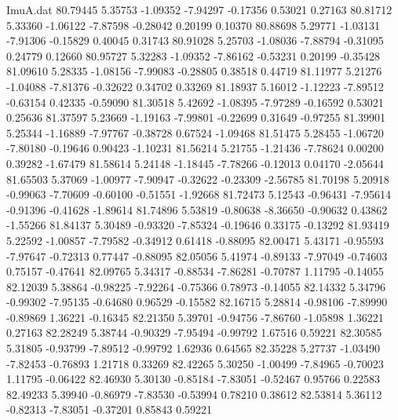 \begin{filecontents}{ImuA.dat}
  80.79445    5.35753   -1.09352   -7.94297   -0.17356    0.53021    0.27163
  80.81712    5.33360   -1.06122   -7.87598   -0.28042    0.20199    0.10370
  80.88698    5.29771   -1.03131   -7.91306   -0.15829    0.40045    0.31743
  80.91028    5.25703   -1.08036   -7.88794   -0.31095    0.24779    0.12660
  80.95727    5.32283   -1.09352   -7.86162   -0.53231    0.20199   -0.35428
  81.09610    5.28335   -1.08156   -7.99083   -0.28805    0.38518    0.44719
  81.11977    5.21276   -1.04088   -7.81376   -0.32622    0.34702    0.33269
  81.18937    5.16012   -1.12223   -7.89512   -0.63154    0.42335   -0.59090
  81.30518    5.42692   -1.08395   -7.97289   -0.16592    0.53021    0.25636
  81.37597    5.23669   -1.19163   -7.99801   -0.22699    0.31649   -0.97255
  81.39901    5.25344   -1.16889   -7.97767   -0.38728    0.67524   -1.09468
  81.51475    5.28455   -1.06720   -7.80180   -0.19646    0.90423   -1.10231
  81.56214    5.21755   -1.21436   -7.78624    0.00200    0.39282   -1.67479
  81.58614    5.24148   -1.18445   -7.78266   -0.12013    0.04170   -2.05644
  81.65503    5.37069   -1.00977   -7.90947   -0.32622   -0.23309   -2.56785
  81.70198    5.20918   -0.99063   -7.70609   -0.60100   -0.51551   -1.92668
  81.72473    5.12543   -0.96431   -7.95614   -0.91396   -0.41628   -1.89614
  81.74896    5.53819   -0.80638   -8.36650   -0.90632    0.43862   -1.55266
  81.84137    5.30489   -0.93320   -7.85324   -0.19646    0.33175   -0.13292
  81.93419    5.22592   -1.00857   -7.79582   -0.34912    0.61418   -0.88095
  82.00471    5.43171   -0.95593   -7.97647   -0.72313    0.77447   -0.88095
  82.05056    5.41974   -0.89133   -7.97049   -0.74603    0.75157   -0.47641
  82.09765    5.34317   -0.88534   -7.86281   -0.70787    1.11795   -0.14055
  82.12039    5.38864   -0.98225   -7.92264   -0.75366    0.78973   -0.14055
  82.14332    5.34796   -0.99302   -7.95135   -0.64680    0.96529   -0.15582
  82.16715    5.28814   -0.98106   -7.89990   -0.89869    1.36221   -0.16345
  82.21350    5.39701   -0.94756   -7.86760   -1.05898    1.36221    0.27163
  82.28249    5.38744   -0.90329   -7.95494   -0.99792    1.67516    0.59221
  82.30585    5.31805   -0.93799   -7.89512   -0.99792    1.62936    0.64565
  82.35228    5.27737   -1.03490   -7.82453   -0.76893    1.21718    0.33269
  82.42265    5.30250   -1.00499   -7.84965   -0.70023    1.11795   -0.06422
  82.46930    5.30130   -0.85184   -7.83051   -0.52467    0.95766    0.22583
  82.49233    5.39940   -0.86979   -7.83530   -0.53994    0.78210    0.38612
  82.53814    5.36112   -0.82313   -7.83051   -0.37201    0.85843    0.59221

\end{filecontents}
